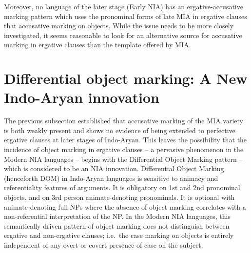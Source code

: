 \documentclass[output=paper,
modfonts
]{LSP/langsci}
\begin{document}
Moreover, no language of the later stage (Early NIA)  has an ergative-accusative marking pattern which uses the pronominal forms of late MIA in ergative clauses that accusative marking on objects. While the issue needs to be more closely investigated, it seems reasonable to look for an alternative source for accusative marking in ergative clauses than the template offered by MIA. 



\section{Differential object marking: A New Indo-Aryan innovation}  
The previous subsection established that accusative  marking  of the MIA variety is both weakly present and shows no evidence of being extended to perfective ergative clauses at later stages of Indo-Aryan. This leaves the possibility that the incidence of object marking in ergative clauses -- a pervasive phenomenon in the Modern NIA languages -- begins with the Differential Object Marking  pattern -- which is considered to be an NIA innovation. Differential Object Marking (henceforth DOM) in Indo-Aryan languages is sensitive to animacy and referentiality features of arguments. It is obligatory on 1st and 2nd pronominal objects, and  on 3rd person animate-denoting pronominals. It is optional with animate-denoting full NPs where the absence of object marking correlates with a non-referential  interpretation of the NP. In the Modern NIA languages, this semantically driven pattern of object marking does not distinguish between ergative and non-ergative clauses; i.e.\ the case marking on objects is entirely independent of any overt or covert presence of case on the subject.  
\end{document}
